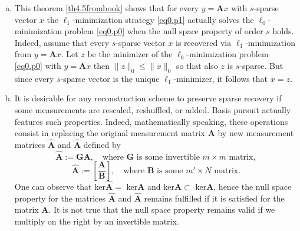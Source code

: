 \begin{remark}
    \label{rmk0.4.6}
    \begin{enumerate}[(a)]
        \item This theorem \cref{th4.5frombook} shows that for every $y = \mathbf{A}x$ with $s$-sparse vector $x$ the $\ell_1$-minimization strategy \cref{eq0.p1} actually solves the $\ell_0$-minimization problem \cref{eq0.p0} when the null space property of order $s$ holds. Indeed, assume that every $s$-sparse vector $x$ is recovered via $\ell_1$-minimization from $y = \mathbf{A}x$. Let $z$ be the minimizer of the $\ell_0$-minimization problem \cref{eq0.p0} with $y = \mathbf{A}x$ then $\|z\|_0 \leq \|x\|_0$ so that also $z$ is $s$-sparse. But since every $s$-sparse vector is the unique $\ell_1$-minimizer, it follows that $x=z$.
        \item It is desirable for any reconstruction scheme to preserve sparse recovery if some measurements are rescaled, reshuffled, or added. Basis pursuit actually features such properties. Indeed, mathematically speaking, these operations consist in replacing the original measurement matrix $\mathbf{A}$ by new measurement matrices $\hat{\mathbf{A}}$ and $\hat{\mathbf{A}}$ defined by 
            \[
                \hat{\mathbf{A}} := \mathbf{GA}, \quad \text{where $\mathbf{G}$ is some invertible $m\times m$ matrix},
            \]
            \[
                \hat{\mathbf{A}} := \left[ \frac{\mathbf{A}}{\mathbf{B}} \right], \quad \text{where $\mathbf{B}$ is some $m' \times N$ matrix}.
            \]
            One can observe that ker$\hat{\mathbf{A}} = $ ker$\mathbf{A}$ and ker$\hat{\mathbf{A}} \subset $ ker$\mathbf{A}$, hence the null space property for the matrices $\hat{\mathbf{A}}$ and $\hat{\mathbf{A}}$ remains fulfilled if it is satisfied for the matrix $\mathbf{A}$. It is not true that the null space property remains valid if we multiply on the right by an invertible matrix.
    \end{enumerate}
\end{remark}

